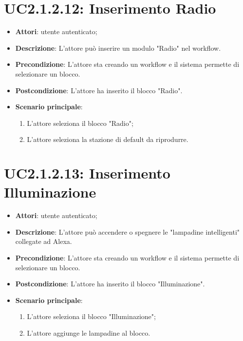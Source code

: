 \section{UC2.1.2.12: Inserimento Radio}
\label{UC2.1.2.12}
\begin{itemize}
	\item \textbf{Attori}: utente autenticato;
	\item \textbf{Descrizione}: L'attore può inserire un modulo "Radio" nel workflow.
	\item \textbf{Precondizione}: L'attore sta creando un workflow e il sistema permette di selezionare un blocco.
	\item \textbf{Postcondizione}: L'attore ha inserito il blocco "Radio".
	\item \textbf{Scenario principale}:
	\begin{enumerate} \item L'attore seleziona il blocco "Radio";  \item  L'attore seleziona la stazione di default da riprodurre.\end{enumerate}
\end{itemize}

\section{UC2.1.2.13: Inserimento Illuminazione}
\label{UC2.1.2.13}
\begin{itemize}
	\item \textbf{Attori}: utente autenticato;
	\item \textbf{Descrizione}: L'attore può accendere o spegnere le "lampadine intelligenti" collegate ad Alexa.
	\item \textbf{Precondizione}: L'attore sta creando un workflow e il sistema permette di selezionare un blocco.
	\item \textbf{Postcondizione}: L'attore ha inserito il blocco "Illuminazione".
	\item \textbf{Scenario principale}:
	\begin{enumerate} \item L'attore seleziona il blocco "Illuminazione";  \item  L'attore aggiunge le lampadine al blocco.\end{enumerate}
\end{itemize}

